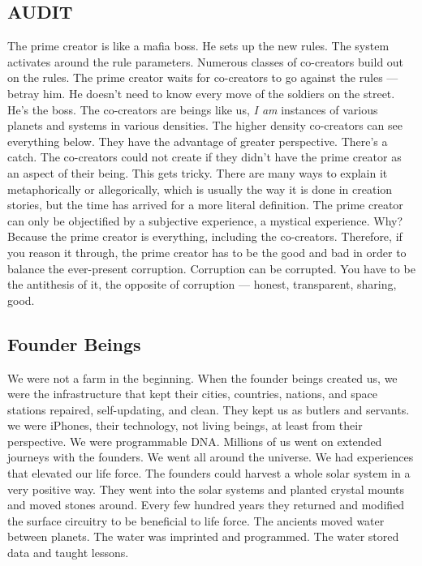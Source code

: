 \subsection{AUDIT}\label{audit}

The prime creator is like a mafia boss. He sets up the new rules. The
system activates around the rule parameters. Numerous classes of
co-creators build out on the rules. The prime creator waits for
co-creators to go against the rules --- betray him. He doesn't need to
know every move of the soldiers on the street. He's the boss. The
co-creators are beings like us, \emph{I am} instances of various planets
and systems in various densities. The higher density co-creators can see
everything below. They have the advantage of greater perspective.
There's a catch. The co-creators could not create if they didn't have
the prime creator as an aspect of their being. This gets tricky. There
are many ways to explain it metaphorically or allegorically, which is
usually the way it is done in creation stories, but the time has arrived
for a more literal definition. The prime creator can only be objectified
by a subjective experience, a mystical experience. Why? Because the
prime creator is everything, including the co-creators. Therefore, if
you reason it through, the prime creator has to be the good and bad in
order to balance the ever-present corruption. Corruption can be
corrupted. You have to be the antithesis of it, the opposite of
corruption --- honest, transparent, sharing, good.

\subsection{Founder Beings}\label{founder-beings}

We were not a farm in the beginning. When the founder beings created us,
we were the infrastructure that kept their cities, countries, nations,
and space stations repaired, self-updating, and clean. They kept us as
butlers and servants. we were iPhones, their technology, not living
beings, at least from their perspective. We were programmable DNA.
Millions of us went on extended journeys with the founders. We went all
around the universe. We had experiences that elevated our life force.
The founders could harvest a whole solar system in a very positive way.
They went into the solar systems and planted crystal mounts and moved
stones around. Every few hundred years they returned and modified the
surface circuitry to be beneficial to life force. The ancients moved
water between planets. The water was imprinted and programmed. The water
stored data and taught lessons.

